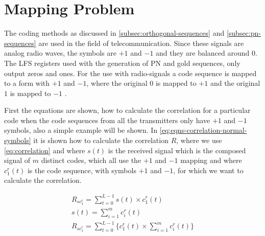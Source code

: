 
\section{Mapping Problem}
\label{sec:mapping-problem}

The coding methods as discussed in \autoref{subsec:orthogonal-sequences} and \autoref{subsec:pn-sequences} are used in the field of telecommunication.
Since these signals are analog radio waves, the symbols are $+1$ and $-1$ and they are balanced around $0$.
The LFS registers used with the generation of PN and gold sequences, only output zeros and ones.
For the use with radio-signals a code sequence is mapped to a form with $+1$ and $-1$, where the original $0$ is mapped to $+1$ and the original $1$ is mapped to $-1$ \cite{cdma-mapping-symbols-ref}.



First the equations are shown, how to calculate the correlation for a particular code when the code sequences from all the transmitters only have $+1$ and $-1$ symbols, also a simple example will be shown. 
In \autoref{eq:eqns-correlation-normal-symbols} it is shown how to calculate the correlation $R$, where we use \autoref{eq:correlation} and where $s(t)$ is the received signal which is the composed signal of $m$ distinct codes, which all use the $+1$ and $-1$ mapping and where $c^r_1(t)$ is the code sequence, with symbols $+1$ and $-1$, for which we want to calculate the correlation.


\begin{equation}
	\begin{array}{l}
		R_{sc^r_{1}} = \displaystyle\sum_{t = 0} ^ {L - 1} s(t) \times c^r_1(t)	 \\
		s(t) = \displaystyle\sum_{i = 1} ^ {m} c^r_i(t) \\
		R_{sc^r_{1}} = \displaystyle\sum_{t = 0} ^ {L - 1} \Bigg\{ c^r_1(t) \times  \displaystyle\sum_{i = 1} ^ {m} c^r_i(t) \Bigg\} 
	\end{array} 
	\label{eq:eqns-correlation-normal-symbols}
\end{equation}



